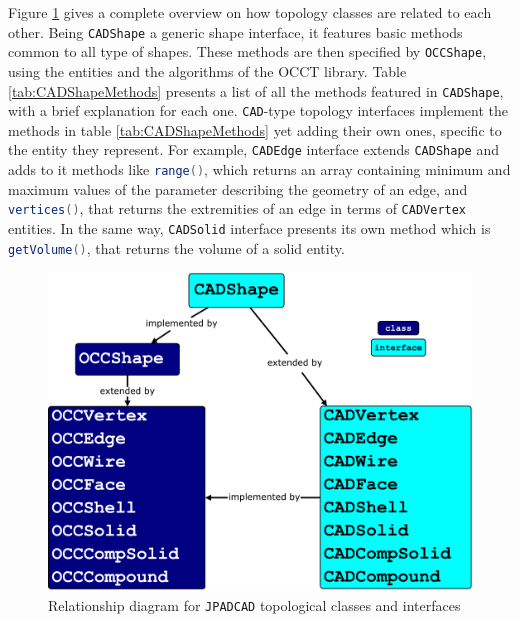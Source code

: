 %
\noindent
Figure \ref{fig:OCCMap} gives a complete overview on how topology classes are related to each other. Being \lstinline[language=Java]!CADShape! a generic shape interface, it features basic methods common to all type of shapes. These methods are then specified by \lstinline[language=Java]!OCCShape!, using the entities and the algorithms of the \gls{OCCT} library. Table \ref{tab:CADShapeMethods} presents a list of all the methods featured in \lstinline[language=Java]!CADShape!, with a brief explanation for each one. \lstinline[language=Java]!CAD!-type topology interfaces implement the methods in table \ref{tab:CADShapeMethods} yet adding their own ones, specific to the entity they represent. For example, \lstinline[language=Java]!CADEdge! interface extends \lstinline[language=Java]!CADShape! and adds to it methods like \lstinline[language=Java]!range()!, which returns an array containing minimum and maximum values of the parameter describing the geometry of an edge, and \lstinline[language=Java]!vertices()!, that returns the extremities of an edge in terms of \lstinline[language=Java]!CADVertex! entities. In the same way, \lstinline[language=Java]!CADSolid! interface presents its own method which is \lstinline[language=Java]!getVolume()!, that returns the volume of a solid entity. 
%
\begin{figure}[H]
\centering
\includegraphics[scale=0.4]{Immagini/Capitolo2/OCCMap}
\caption{Relationship diagram for \lstinline[language=Java]!JPADCAD! topological classes and interfaces}
\label{fig:OCCMap}
\end{figure}
%
\bigskip
